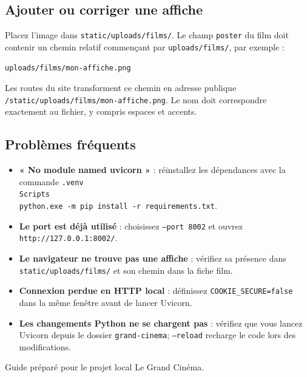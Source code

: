 \documentclass[11pt,a4paper]{article}
\begin{document}
\subsection{Ajouter ou corriger une affiche}
Placez l'image dans \texttt{static/uploads/films/}. Le champ \texttt{poster} du film doit contenir un chemin relatif commençant par \texttt{uploads/films/}, par exemple :
\begin{lstlisting}[style=powershell]
uploads/films/mon-affiche.png
\end{lstlisting}
Les routes du site transforment ce chemin en adresse publique \texttt{/static/uploads/films/mon-affiche.png}. Le nom doit correspondre exactement au fichier, y compris espaces et accents.

\subsection{Problèmes fréquents}
\begin{itemize}
  \item \textbf{« No module named uvicorn »} : réinstallez les dépendances avec la commande \texttt{.venv\\Scripts\\python.exe -m pip install -r requirements.txt}.
  \item \textbf{Le port est déjà utilisé} : choisissez \texttt{--port 8002} et ouvrez \texttt{http://127.0.0.1:8002/}.
  \item \textbf{Le navigateur ne trouve pas une affiche} : vérifiez sa présence dans \texttt{static/uploads/films/} et son chemin dans la fiche film.
  \item \textbf{Connexion perdue en HTTP local} : définissez \texttt{COOKIE\_SECURE=false} dans la même fenêtre avant de lancer Uvicorn.
  \item \textbf{Les changements Python ne se chargent pas} : vérifiez que vous lancez Uvicorn depuis le dossier \texttt{grand-cinema}; \texttt{--reload} recharge le code lors des modifications.
\end{itemize}

\vfill
\begin{center}\small\color{muted}Guide préparé pour le projet local Le Grand Cinéma.\end{center}
\end{document}
